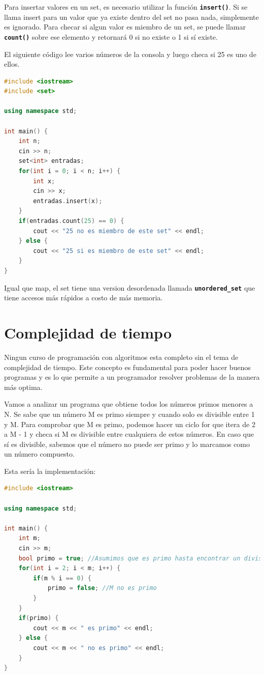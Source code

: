 \documentclass{article}
\begin{document}
Para insertar valores en un set, es necesario utilizar la función \textbf{\lstinline{insert()}}. Si se llama insert para un valor que ya existe dentro del set no pasa nada, simplemente es ignorado. Para checar si algun valor es miembro de un set, se puede llamar \textbf{\lstinline{count()}} sobre ese elemento y retornará 0 si no existe o 1 si sí existe.

El siguiente código lee varios números de la consola y luego checa si 25 es uno de ellos.

\begin{lstlisting}[language=C++, caption=Sets]
#include <iostream>
#include <set>

using namespace std;

int main() {
    int n;
    cin >> n;
    set<int> entradas;
    for(int i = 0; i < n; i++) {
        int x;
        cin >> x;
        entradas.insert(x);
    }
    if(entradas.count(25) == 0) {
        cout << "25 no es miembro de este set" << endl;
    } else {
        cout << "25 si es miembro de este set" << endl;
    }
}
\end{lstlisting}

Igual que map, el set tiene una version desordenada llamada \textbf{\lstinline{unordered_set}} que tiene accesos más rápidos a costo de más memoria.

\section{Complejidad de tiempo}

Ningun curso de programación con algoritmos esta completo sin el tema de complejidad de tiempo. Este concepto es fundamental para poder hacer buenos programas y es lo que permite a un programador resolver problemas de la manera más optima.

Vamos a analizar un programa que obtiene todos los números primos menores a N. Se sabe que un número M es primo siempre y cuando solo es divisible entre 1 y M. Para comprobar que M es primo, podemos hacer un ciclo for que itera de 2 a M - 1 y checa si M es divisible entre cualquiera de estos números. En caso que sí es divisible, sabemos que el número no puede ser primo y lo marcamos como un número compuesto.

Esta sería la implementación:

\begin{lstlisting}[language=C++, caption=Probando si M es primo]
#include <iostream>

using namespace std;

int main() {
    int m;
    cin >> m;
    bool primo = true; //Asumimos que es primo hasta encontrar un divisor
    for(int i = 2; i < m; i++) {
        if(m % i == 0) {
            primo = false; //M no es primo
        }
    }
    if(primo) {
        cout << m << " es primo" << endl;
    } else {
        cout << m << " no es primo" << endl;
    }
}
\end{lstlisting}
\end{document}
